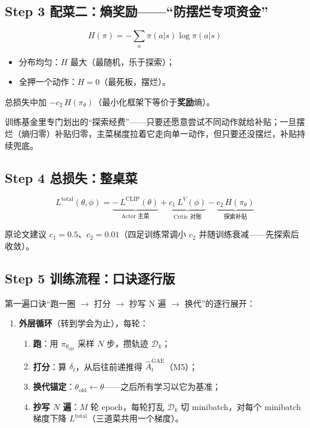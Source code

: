 \documentclass[UTF8,12pt,a4paper]{ctexrep}
\newcommand{\plain}[1]{\begin{plainbox}#1\end{plainbox}}
\begin{document}
\subsection*{Step 3 \; 配菜二：熵奖励——``防摆烂专项资金''}

$$
H(\pi) = -\sum_a \pi(a|s)\log\pi(a|s)
$$

\begin{itemize}[nosep]
  \item 分布均匀：$H$ 最大（最随机，乐于探索）；
  \item 全押一个动作：$H = 0$（最死板，摆烂）。
\end{itemize}

总损失中加 $-c_2\,H(\pi_\theta)$（最小化框架下等价于\textbf{奖励}熵）。

\plain{训练基金里专门划出的``探索经费''——只要还愿意尝试不同动作就给补贴；一旦摆烂（熵归零）补贴归零，主菜梯度拉着它走向单一动作，但只要还没摆烂，补贴持续兜底。}

\subsection*{Step 4 \; 总损失：整桌菜}

$$
L^{\mathrm{total}}(\theta, \phi) = \underbrace{-\,L^{\mathrm{CLIP}}(\theta)}_{\text{Actor 主菜}} + \underbrace{c_1\, L^{V}(\phi)}_{\text{Critic 对账}} - \underbrace{c_2\, H(\pi_\theta)}_{\text{探索补贴}}
$$

原论文建议 $c_1 = 0.5$、$c_2 = 0.01$（四足训练常调小 $c_2$ 并随训练衰减——先探索后收敛）。

\subsection*{Step 5 \; 训练流程：口诀逐行版}

第一遍口诀``跑一圈 $\to$ 打分 $\to$ 抄写 N 遍 $\to$ 换代''的逐行展开：

\begin{enumerate}[nosep]
  \item \textbf{外层循环}（转到学会为止），每轮：
  \begin{enumerate}[nosep]
    \item \textbf{跑}：用 $\pi_{\theta_{\mathrm{old}}}$ 采样 $N$ 步，攒轨迹 $\mathcal{D}_k$；
    \item \textbf{打分}：算 $\delta_t$，从后往前递推得 $\hat{A}^{\mathrm{GAE}}_t$（M5）；
    \item \textbf{换代锚定}：$\theta_{\mathrm{old}} \leftarrow \theta$——之后所有学习以它为基准；
    \item \textbf{抄写 $N$ 遍}：$M$ 轮 epoch，每轮打乱 $\mathcal{D}_k$ 切 minibatch，对每个 minibatch 梯度下降 $L^{\mathrm{total}}$（三道菜共用一个梯度）。
  \end{enumerate}
\end{enumerate}
\end{document}
